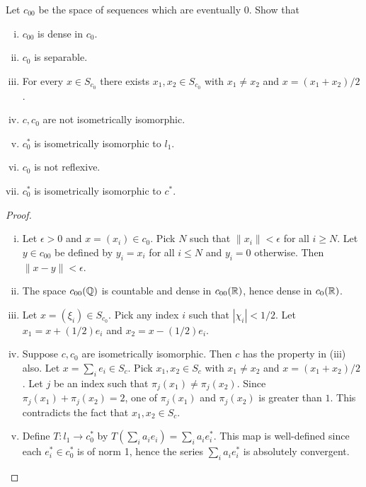 \documentclass{article}
\begin{document}
 Let $c_{00}$ be the space of sequences which are eventually $0$. Show that
\begin{enumerate}[i)]
\item $c_{00}$ is dense in $c_0$.
\item $c_0$ is separable.
\item For every $x \in S_{c_0}$ there exists $x_1, x_2 \in S_{c_0}$ with $x_1 \neq x_2$  and $x = (x_1 + x_2)/2$.
\item $c, c_0$ are not isometrically isomorphic.
\item $c_0^*$ is isometrically isomorphic to $l_1$.
\item $c_0$ is not reflexive.
\item $c_0^*$ is isometrically isomorphic to $c^*$.
\end{enumerate}

\begin{proof}
\begin{enumerate}[i)]
\item Let $\epsilon > 0$ and $x = (x_i) \in c_0$. Pick $N$ such that $\|x_i\| < \epsilon$ for all $i \ge N$. Let $y \in c_{00}$ be defined by $y_i = x_i$ for all $i \le N$ and $y_i = 0$ otherwise. Then $\|x - y\| < \epsilon$.

\item The space $c_{00}(\mathbb{Q})$ is countable and dense in $c_{00}(\mathbb{R})$, hence dense in $c_0(\mathbb{R})$.

\item Let $x = (\xi_i) \in S_{c_0}$.  Pick any index $i$ such that $|\chi_i| < 1/2$.  Let $x_1 = x + (1/2) e_i$ and $x_2 = x - (1/2) e_i$.

\item Suppose $c, c_0$ are isometrically isomorphic.  Then $c$ has the property in (iii) also. Let $x = \sum_i e_i \in S_c$.  Pick $x_1, x_2 \in S_c$ with $x_1 \neq x_2$ and $x = (x_1 + x_2)/2$.  Let $j$ be an index such that $\pi_j(x_1) \neq \pi_j(x_2)$.  Since $\pi_j(x_1) + \pi_j(x_2) = 2$, one of $\pi_j(x_1)$ and $\pi_j(x_2)$ is greater than $1$. This contradicts the fact that $x_1, x_2 \in S_c$.

\item Define $T: l_1 \to c_0^*$ by $T(\sum_i a_i e_i) = \sum_i a_i e_i^*$. This map is well-defined since each $e_i^* \in c_0^*$ is of norm 1, hence the series $\sum_i a_i e_i^*$ is absolutely convergent.  

\end{enumerate}

\end{proof}
\end{document}
